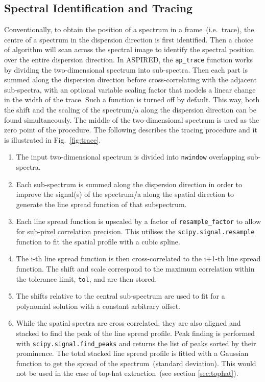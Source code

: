 \documentclass[linenumbers, twocolumn]{aastex631}
\begin{document}
\subsection{Spectral Identification and Tracing}
\label{sec:tracing}
Conventionally, to obtain the position of a spectrum in a frame~(i.e.\ trace),
the centre of a spectrum in the dispersion direction is first identified. Then
a choice of algorithm will scan across the spectral image to identify
the spectral position over the entire dispersion direction. In \textsc{ASPIRED},
the \texttt{ap\_trace} function works by dividing the two-dimensional spectrum
into sub-spectra. Then each part is summed along the dispersion direction
before cross-correlating with the adjacent sub-spectra, with an optional variable
scaling factor that models a linear change in the width of the trace. Such a
function is turned off by default. This way, both the shift and the scaling of
the spectrum/a along the dispersion direction can be found simultaneously. The
middle of the two-dimensional spectrum is used as the zero point of the
procedure. The following describes the tracing procedure and it is illustrated in Fig.~\ref{fig:trace}.
\begin{enumerate}
    \item
        The input two-dimensional spectrum is divided into \texttt{nwindow}
        overlapping sub-spectra.
    \item
        Each sub-spectrum is summed along the dispersion direction
        in order to improve the signal(s) of the spectrum/a along
        the spatial direction to generate the line spread function
        of that subspectrum.
    \item
        Each line spread function is upscaled by a factor of
        \texttt{resample\_factor} to allow for sub-pixel correlation
        precision. This utilises the \texttt{scipy.signal.resample}
        function to fit the spatial profile with a cubic spline.
    \item
        The i-th line spread function is then cross-correlated to the i+1-th
        line spread function. The shift and scale correspond to the maximum
        correlation within the tolerance limit, \texttt{tol}, and are then stored.
    \item
        The shifts relative to the central sub-spectrum are used to
        fit for a polynomial solution with a constant arbitrary offset.
    \item
        While the spatial spectra are cross-correlated, they are also
        aligned and stacked to find the peak of the line spread profile.
        Peak finding is performed with \texttt{scipy.signal.find\_peaks}
        and returns the list of peaks sorted by their prominence. The
        total stacked line spread profile is fitted with a Gaussian
        function to get the spread of the spectrum~(standard deviation).
        This would not be used in the case of top-hat
        extraction~(see section \textsection\ref{sec:tophat}).
\end{enumerate}
\end{document}
